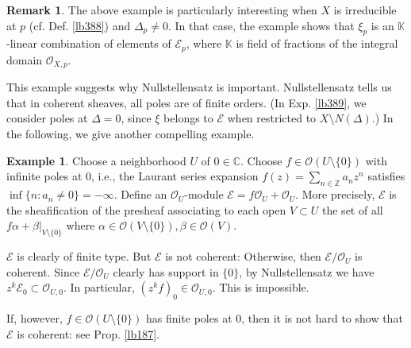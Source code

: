 \documentclass[12pt,b5paper,notitlepage]{report}
\theoremstyle{definition}
\newtheorem{eg}[df]{Example}
\newtheorem{rem}[df]{Remark}
\theoremstyle{plain}
\newcommand{\scr}{\mathscr}
\newcommand{\Kbb}{\mathbb K}
\newcommand{\Cbb}{\mathbb C}
\newcommand{\Zbb}{\mathbb Z}
\numberwithin{equation}{section}
\begin{document}
\begin{rem}
The above example is particularly interesting when $X$ is irreducible at $p$ (cf. Def. \ref{lb388}) and $\Delta_p\neq 0$. In that case, the example shows that $\xi_p$ is an $\Kbb$-linear combination of elements of $\scr E_p$, where $\Kbb$ is field of fractions of the integral domain $\scr O_{X,p}$. 

This example suggests why Nullstellensatz is important. Nullstellensatz tells us that in coherent sheaves, all poles are of finite orders. (In Exp. \ref{lb389}, we consider poles at $\varDelta=0$, since $\xi$ belongs to $\scr E$ when restricted to $X\setminus N(\varDelta)$.) In the following, we give another compelling example.  \hfill\qedsymbol
\end{rem}

\begin{eg}
Choose a neighborhood $U$ of $0\in\Cbb$. Choose $f\in\scr O(U\setminus\{0\})$ with infinite poles at $0$, i.e., the Laurant series expansion $f(z)=\sum_{n\in\Zbb}a_nz^n$ satisfies $\inf\{n:a_n\neq0\}=-\infty$. Define an $\scr O_U$-module $\scr E=f\scr O_U+\scr O_U$. More precisely, $\scr E$ is the sheafification of the presheaf associating to each open $V\subset U$ the set of all $f\alpha+\beta|_{V\setminus\{0\}}$ where $\alpha\in\scr O(V\setminus\{0\}),\beta\in\scr O(V)$.

$\scr E$ is clearly of finite type. But $\scr E$ is not coherent:  Otherwise, then $\scr E/\scr O_U$ is coherent. Since $\scr E/\scr O_U$ clearly has support in $\{0\}$, by Nullstellensatz we have $z^k\scr E_0\subset\scr O_{U,0}$. In particular, $(z^kf)_0\in\scr O_{U,0}$. This is impossible.

If, however, $f\in\scr O(U\setminus\{0\})$ has finite poles at $0$, then it is not hard to show that $\scr E$ is coherent: see Prop. \ref{lb187}.
\end{eg}
\end{document}
